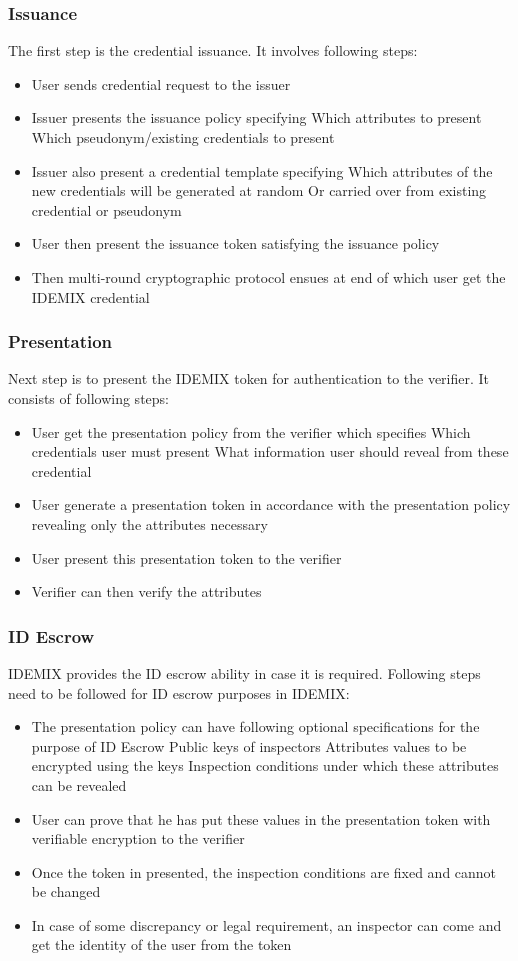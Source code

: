 \subsubsection{Issuance}
The first step is the credential issuance. It involves following steps:
\begin{itemize}
	\item User sends credential request to the issuer
	\item Issuer presents the issuance policy specifying
		\subitem Which attributes to present
		\subitem Which pseudonym/existing credentials to present
	\item Issuer also present a credential template specifying
		\subitem Which attributes of the new credentials will be generated at random
		\subitem Or carried over from existing credential or pseudonym
	\item User then present the issuance token satisfying the issuance policy
	\item Then multi-round cryptographic protocol ensues at end of which user get the IDEMIX credential
\end{itemize}
\subsubsection{Presentation}
Next step is to present the IDEMIX token for authentication to the verifier. It consists of following steps:
\begin{itemize}
	\item User get the presentation policy from the verifier which specifies
		\subitem Which credentials user must present
		\subitem What information user should reveal from these credential
	\item User generate a presentation token in accordance with the presentation policy revealing only the attributes necessary
	\item User present this presentation token to the verifier
	\item Verifier can then verify the attributes
\end{itemize}
\subsubsection{ID Escrow}
IDEMIX provides the ID escrow ability in case it is required. Following steps need to be followed for ID escrow purposes in IDEMIX:
\begin{itemize}
	\item The presentation policy can have following optional specifications for the purpose of ID Escrow
		\subitem Public keys of inspectors
		\subitem Attributes values to be encrypted using the keys	
		\subitem Inspection conditions under which these attributes can be revealed
	\item User can prove that he has put these values in the presentation token with verifiable encryption to the verifier
	\item Once the token in presented, the inspection conditions are fixed and cannot be changed 
	\item In case of some discrepancy or legal requirement, an inspector can come and get the identity of the user from the token
\end{itemize}


